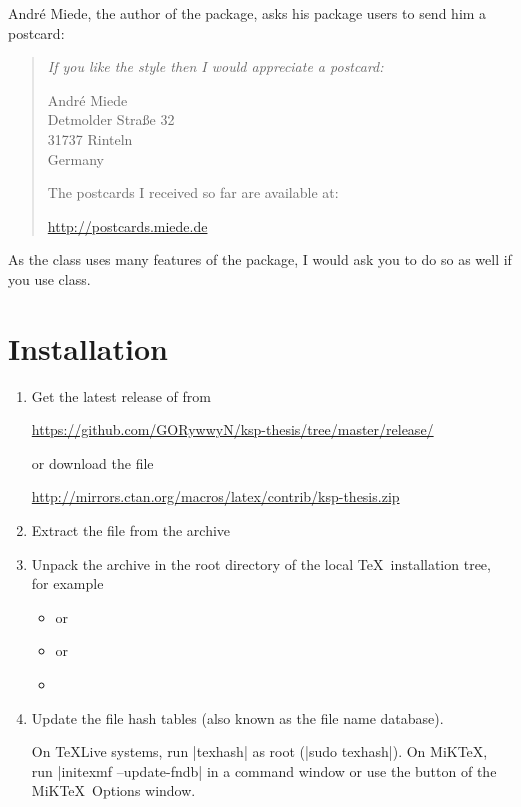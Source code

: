 \pagebreak %
André Miede, the author of the  package, asks his package users to send him a postcard:
\begin{quote}\itshape
   If you like the style then I would appreciate a postcard:
   \begin{center}
    André Miede \\
    Detmolder Straße 32 \\
    31737 Rinteln \\
    Germany
   \end{center}
   The postcards I received so far are available at:
   \begin{center}
    \url{http://postcards.miede.de}
   \end{center}
\end{quote}
As the  class uses many features of the  package, I would ask you to do so as well if you use  class.

\section{Installation}

\begin{enumerate}
   \item Get the latest release of  from

      \url{https://github.com/GORywwyN/ksp-thesis/tree/master/release/}

   or download the file

      \url{http://mirrors.ctan.org/macros/latex/contrib/ksp-thesis.zip}
      
   \item Extract the file  from the archive

   \item Unpack the  archive in the root directory of the local \TeX\ installation tree, for example
   
   \begin{itemize}
      \item {} or
      \item {} or
      \item {}
   \end{itemize}

\item Update the file hash tables (also known as the file name database).
   
   On \TeX Live systems, run |texhash| as root (|sudo texhash|). On MiK\TeX, run |initexmf --update-fndb| in a command window or use the  button of the MiK\TeX\ Options window.
\end{enumerate}

